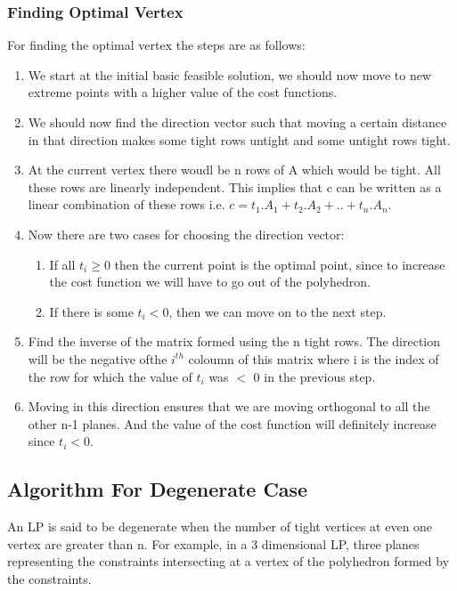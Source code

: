 \documentclass[a4paper,12pt]{report}
\begin{document}
\subsubsection{Finding Optimal Vertex}
For finding the optimal vertex the steps are as follows:
\begin{enumerate}
\item We start at the initial basic feasible solution, we should now move to new extreme points with a higher value of the cost functions.
\item We should now find the direction vector such that moving a certain distance in that direction makes some tight rows untight and some untight rows tight.
\item At the current vertex there woudl be n rows of A which would be tight. All these rows are linearly independent. This implies that c can be written as a linear combination of these rows i.e. $c = t_1.A_1 + t_2.A_2 + .. + t_n.A_n$.
\item Now there are two cases for choosing the direction vector:
\begin{enumerate}
\item If all $t_i \geq 0$ then the current point is the optimal point, since to increase the cost function we will have to go out of the polyhedron.
\item If there is some $t_i < 0$, then we can move on to the next step.
\end{enumerate}
\item Find the inverse of the matrix formed using the n tight rows. The direction will be the negative ofthe  $i^{th}$ coloumn of this matrix where i is the index of the row for which the value of $t_i$ was $<$ 0 in the previous step.
\item Moving in this direction ensures that we are moving orthogonal to all the other n-1 planes. And the value of the cost function will definitely increase since $t_i < 0$.
\end{enumerate}
\subsection{Algorithm For Degenerate Case}
An LP is said to be degenerate when the number of tight vertices at even one vertex are greater than n. For example, in a 3 dimensional LP, three planes representing the constraints intersecting at a vertex of the polyhedron formed by the constraints. 
\end{document}
